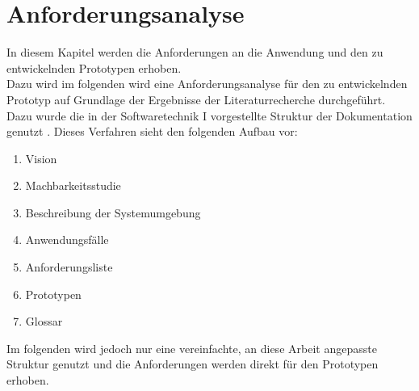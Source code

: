 \chapter{Anforderungsanalyse}\label{chapter:anforderungsanalyse}
In diesem Kapitel werden die Anforderungen an die Anwendung und den zu entwickelnden Prototypen erhoben. \\
Dazu wird im folgenden wird eine Anforderungsanalyse für den zu entwickelnden Prototyp auf Grundlage der Ergebnisse der Literaturrecherche durchgeführt.
Dazu wurde die in der Softwaretechnik I  vorgestellte Struktur der Dokumentation genutzt \citep[Folie 209-214]{winter:srs-anforderungen}. 
Dieses Verfahren sieht den folgenden Aufbau vor:
\begin{enumerate}
\item Vision 
\item Machbarkeitsstudie
\item Beschreibung der Systemumgebung
\item Anwendungsfälle
\item Anforderungsliste
\item Prototypen
\item Glossar
\end{enumerate}
Im folgenden wird jedoch nur eine vereinfachte, an diese Arbeit angepasste Struktur genutzt und die Anforderungen werden direkt für den Prototypen erhoben.


